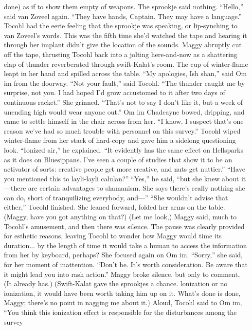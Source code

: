 \documentclass[9pt]{article}
\begin{document}
done) as if to show them empty of weapons.
The sprookje said nothing.
“Hello,” said van Zoveel again. “They have hands, Captain. They may have a language.”
Tocohl had the eerie feeling that the sprookje was speaking, or lip-synching to van Zoveel’s words.
This was the fifth time she’d watched the tape and hearing it through her implant didn’t give the location
of the sounds.
Maggy abruptly cut off the tape, thrusting Tocohl back into a jolting here-and-now as a shattering
clap of thunder reverberated through swift-Kalat’s room. The cup of winter-flame leapt in her hand and
spilled across the table.
“My apologies, Ish shan,” said Om im from the doorway.
“Not your fault,” said Tocohl. “The thunder caught me by surprise, not you. I had hoped I’d grow
accustomed to it after two days of continuous racket.” She grinned. “That’s not to say I don’t like it, but
a week of unending high would wear anyone out.”
Om im Chadeayne bowed, dripping, and came to settle himself in the chair across from her. “I know.
I suspect that’s one reason we’ve had so much trouble with personnel on this survey.”
Tocohl wiped winter-flame from her stack of hard-copy and gave him a sidelong questioning look.
“Ionized air,” he explained. “It evidently has the same effect on Hellsparks as it does on Bluesippans.
I’ve seen a couple of studies that show it to be an activator of sorts: creative people get more creative,
and nuts get nuttier.”
“Have you mentioned this to layli-layli calulan?”
“Yes,” he said, “but she knew about it—there are certain advantages to shamanism. She says there’s
really nothing she can do, short of tranquilizing everybody, and—”
“She wouldn’t advise that either,” Tocohl finished. She leaned forward, folded her arms on the table.
(Maggy, have you got anything on that?)
(Let me look,) Maggy said, much to Tocohl’s amusement, and then there was silence. The pause
was clearly provided for esthetic reasons, leaving Tocohl to wonder how Maggy would time its
duration... by the length of time it would take a human to access the information from her by keyboard,
perhaps?
She focused again on Om im. “Sorry,” she said, for her moment of inattention.
“Don’t be. It’s worth consideration. Be aware that it might lead you into rash action.”
Maggy broke silence, but only to comment, (It already has.)
(Swift-Kalat gave the sprookjes a chance. lonization or no ionization, it would have been worth
taking him up on it. What’s done is done, Maggy; there’s no point in nagging me about it.) Aloud, Tocohl
said to Om im, “You think this ionization effect is responsible for the disturbances among the survey
\end{document}
